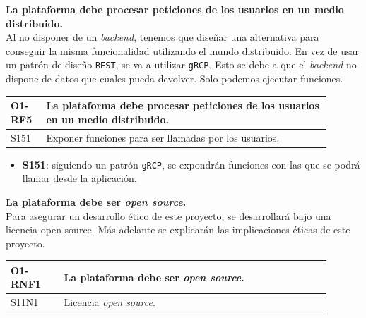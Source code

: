 \textbf{La plataforma debe procesar peticiones de los usuarios en un medio distribuido.}\\
Al no disponer de un \textit{backend}, tenemos que diseñar una alternativa para conseguir la misma funcionalidad utilizando el mundo distribuido. En vez de usar un patrón de diseño \verb|REST|, se va a utilizar \verb|gRCP|. Esto se debe a que el \textit{backend} no dispone de datos que cuales pueda devolver. Solo podemos ejecutar funciones.
\begin{center}
    \begin{table}[h!]
        \begin{tabular}{|p{0.1\linewidth} | p{0.8\linewidth}|}
            \hline
            
            \textbf{O1-RF5} & \textbf{La plataforma debe procesar peticiones de los usuarios en un medio distribuido.} \\
            \hline
            S151            & Exponer funciones para ser llamadas por los usuarios. \\
            \hline
        \end{tabular}
    \end{table}
\end{center}
\begin{itemize}
    \item \textbf{S151}: siguiendo un patrón \verb|gRCP|, se expondrán funciones con las que se podrá llamar desde la aplicación.
\end{itemize}
\textbf{La plataforma debe ser \textit{open source}.}\\
Para asegurar un desarrollo ético de este proyecto, se desarrollará bajo una licencia open source. Más adelante se explicarán las implicaciones éticas de este proyecto.
\begin{center}
    \begin{table}[h!]
        \begin{tabular}{|p{0.15\linewidth} | p{0.75\linewidth}|}
            \hline
             
            \textbf{O1-RNF1} & \textbf{La plataforma debe ser \textit{open source}.} \\
            \hline
            S11N1            & Licencia \textit{open source}. \\
            \hline
        \end{tabular}
    \end{table}
\end{center}

